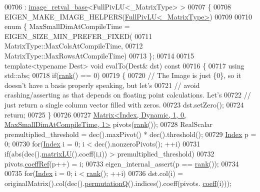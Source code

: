 \begin{DoxyCode}
00706   : \hyperlink{struct_eigen_1_1internal_1_1image__retval__base}{image\_retval\_base}<FullPivLU<\_MatrixType> >
00707 \{
00708   EIGEN\_MAKE\_IMAGE\_HELPERS(\hyperlink{group___l_u___module_class_eigen_1_1_full_piv_l_u}{FullPivLU<\_MatrixType>})
00709 
00710   \textcolor{keyword}{enum} \{ MaxSmallDimAtCompileTime = EIGEN\_SIZE\_MIN\_PREFER\_FIXED(
00711             MatrixType::MaxColsAtCompileTime,
00712             MatrixType::MaxRowsAtCompileTime)
00713   \};
00714 
00715   \textcolor{keyword}{template}<\textcolor{keyword}{typename} Dest> \textcolor{keywordtype}{void} evalTo(Dest& dst)\textcolor{keyword}{ const}
00716 \textcolor{keyword}{  }\{
00717     \textcolor{keyword}{using} std::abs;
00718     \textcolor{keywordflow}{if}(\hyperlink{group___l_u___module_a67a870aa69e699e058d04802ba0bdad9}{rank}() == 0)
00719     \{
00720       \textcolor{comment}{// The Image is just \{0\}, so it doesn't have a basis properly speaking, but let's}
00721       \textcolor{comment}{// avoid crashing/asserting as that depends on floating point calculations. Let's}
00722       \textcolor{comment}{// just return a single column vector filled with zeros.}
00723       dst.setZero();
00724       \textcolor{keywordflow}{return};
00725     \}
00726 
00727     \hyperlink{group___core___module_class_eigen_1_1_matrix}{Matrix<Index, Dynamic, 1, 0, MaxSmallDimAtCompileTime, 1>}
       pivots(\hyperlink{group___l_u___module_a67a870aa69e699e058d04802ba0bdad9}{rank}());
00728     RealScalar premultiplied\_threshold = dec().maxPivot() * dec().threshold();
00729     \hyperlink{namespace_eigen_a62e77e0933482dafde8fe197d9a2cfde}{Index} p = 0;
00730     \textcolor{keywordflow}{for}(\hyperlink{namespace_eigen_a62e77e0933482dafde8fe197d9a2cfde}{Index} i = 0; i < dec().nonzeroPivots(); ++i)
00731       \textcolor{keywordflow}{if}(abs(dec().\hyperlink{group___l_u___module_afea0b8fc707a9097d46fe358cb18bbff}{matrixLU}().coeff(i,i)) > premultiplied\_threshold)
00732         pivots.\hyperlink{class_eigen_1_1_plain_object_base_a25626a55b26a4323565f79d1b7c48ea8}{coeffRef}(p++) = i;
00733     eigen\_internal\_assert(p == \hyperlink{group___l_u___module_a67a870aa69e699e058d04802ba0bdad9}{rank}());
00734 
00735     \textcolor{keywordflow}{for}(\hyperlink{namespace_eigen_a62e77e0933482dafde8fe197d9a2cfde}{Index} i = 0; i < \hyperlink{group___l_u___module_a67a870aa69e699e058d04802ba0bdad9}{rank}(); ++i)
00736       dst.col(i) = originalMatrix().col(dec().\hyperlink{group___l_u___module_a8d18190c7618de271cba7293f0493a36}{permutationQ}().indices().coeff(pivots.
      \hyperlink{class_eigen_1_1_plain_object_base_afbfc12954f16d21aedb7bd839f64a278}{coeff}(i)));

\end{DoxyCode}

